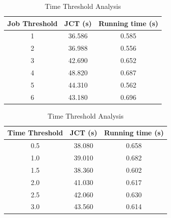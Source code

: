 \documentclass{llncs}
\begin{document}
\begin{table}[htbp]
    \centering
    \begin{minipage}[t]{0.49\textwidth}
    \centering
    \caption{Job Threshold Analysis}
    \begin{tabular}{|c|c|c|}
    \hline
    Job Threshold  & JCT (s) & Running time (s) \\ \hline
    1 & 36.586 & 0.585 \\ \hline
    2 & 36.988 & 0.556  \\ \hline
    3 & 42.690 & 0.652   \\ \hline
    4 & 48.820 & 0.687  \\ \hline
    5 & 44.310 & 0.562  \\ \hline
    6 & 43.180 & 0.696  \\ \hline
    \end{tabular}
    \label{tab:jobSens}
    \end{minipage}
    \begin{minipage}[t]{0.49\textwidth}
    \centering
    \caption{Time Threshold Analysis}
    \begin{tabular}{|c|c|c|}
    \hline
    Time Threshold  & JCT (s) & Running time (s) \\ \hline
    0.5 & 38.080 & 0.658 \\ \hline
    1.0 & 39.010 & 0.682  \\ \hline
    1.5 & 38.360 & 0.602   \\ \hline
    2.0 & 41.030 & 0.617  \\ \hline
    2.5 & 42.060 & 0.630  \\ \hline
    3.0 & 43.560 & 0.614  \\ \hline
    \end{tabular}
    \label{tab:timeSens}
    \end{minipage}
\end{table}
\end{document}
